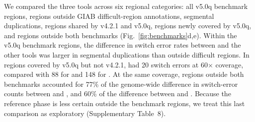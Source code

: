We compared the three tools across six regional categories: all v5.0q benchmark regions, regions outside GIAB difficult-region annotations\cite{dwarshuis2024stratifications}, segmental duplications, regions shared by v4.2.1 and v5.0q, regions newly covered by v5.0q\cite{olson2026giabv5}, and regions outside both benchmarks (Fig.~\ref{fig:benchmarks}d,e). Within the v5.0q benchmark regions, the difference in switch error rates between \toolname and the other tools was larger in segmental duplications than outside difficult regions. In regions covered by v5.0q but not v4.2.1, \toolname had 20 switch errors at 60$\times$ coverage, compared with 88 for \whatshap and 148 for \hapcut. At the same coverage, regions outside both benchmarks accounted for 77\% of the genome-wide difference in switch-error counts between \whatshap and \toolname, and 60\% of the difference between \hapcut and \toolname. Because the reference phase is less certain outside the benchmark regions, we treat this last comparison as exploratory (Supplementary Table~8).

